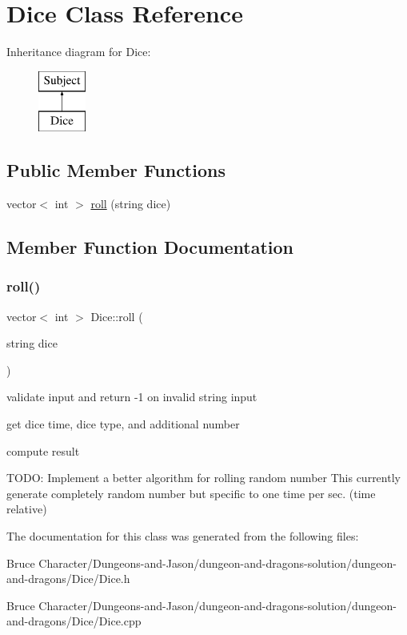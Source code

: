\hypertarget{class_dice}{}\section{Dice Class Reference}
\label{class_dice}
Inheritance diagram for Dice\+:\begin{figure}[H]
\begin{center}
\leavevmode
\includegraphics[height=2.000000cm]{class_dice}
\end{center}
\end{figure}
\subsection*{Public Member Functions}
\begin{DoxyCompactItemize}
\item 
vector$<$ int $>$ \hyperlink{class_dice_a97b0a3128e70c3899f0a1a508381d778}{roll} (string dice)
\end{DoxyCompactItemize}


\subsection{Member Function Documentation}
\hypertarget{class_dice_a97b0a3128e70c3899f0a1a508381d778}{}\label{class_dice_a97b0a3128e70c3899f0a1a508381d778} 
\subsubsection{\texorpdfstring{roll()}{roll()}}
{\footnotesize\ttfamily vector$<$ int $>$ Dice\+::roll (\begin{DoxyParamCaption}\item[{string}]{dice }\end{DoxyParamCaption})}

validate input and return -\/1 on invalid string input

get dice time, dice type, and additional number

compute result

T\+O\+DO\+: Implement a better algorithm for rolling random number This currently generate completely random number but specific to one time per sec. (time relative) 

The documentation for this class was generated from the following files\+:\begin{DoxyCompactItemize}
\item 
Bruce Character/\+Dungeons-\/and-\/\+Jason/dungeon-\/and-\/dragons-\/solution/dungeon-\/and-\/dragons/\+Dice/Dice.\+h\item 
Bruce Character/\+Dungeons-\/and-\/\+Jason/dungeon-\/and-\/dragons-\/solution/dungeon-\/and-\/dragons/\+Dice/Dice.\+cpp\end{DoxyCompactItemize}
